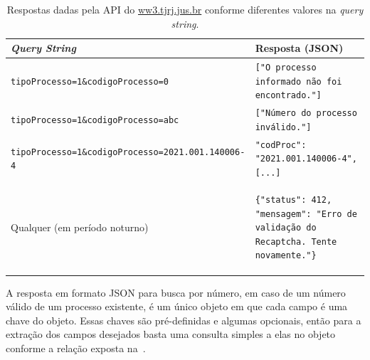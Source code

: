 \begin{table}[htb]
    \tiny
    \centering
    \begin{tabular}{lp{}}
        \toprule
        \textit{Query String} & Resposta (JSON) \\
        \midrule
        \texttt{tipoProcesso=1\&codigoProcesso=0} & \texttt{["O processo informado não foi encontrado."]} \\
        \texttt{tipoProcesso=1\&codigoProcesso=abc} & \texttt{["Número do processo inválido."]} \\
        \texttt{tipoProcesso=1\&codigoProcesso=2021.001.140006-4} & \texttt{{"codProc": "2021.001.140006-4", [...]}} \\
        Qualquer (em período noturno) & \begin{minipage}{0.6\textwidth}
            \begin{verbatim}
{"status": 412, "mensagem": "Erro de validação do Recaptcha. Tente novamente."}
            \end{verbatim}
        \end{minipage}
        \\
        \bottomrule
    \end{tabular}
    \caption{%
        Respostas dadas pela API do \url{ww3.tjrj.jus.br} conforme diferentes valores na \textit{query string}.
    }
    \label{tbl:respostas-ww3}
\end{table}

A resposta em formato JSON para busca por número, em caso de um número válido
de um processo existente, é um único objeto em que cada campo é uma chave do
objeto. Essas chaves são pré-definidas e algumas opcionais, então para a
extração dos campos desejados basta uma consulta simples a elas no objeto
conforme a relação exposta na~.


